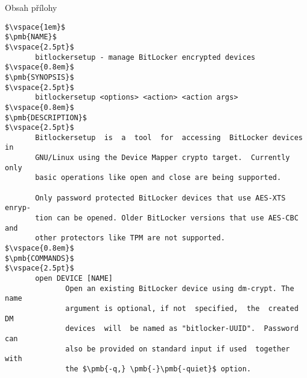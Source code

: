 
\listofappendices

\label{attachment:metadata}
Obsah přílohy

\label{attachment:manpage}


\begin{lstlisting}[frame=none, escapechar=$, columns=fullflexible, keepspaces=true, basicstyle=\ttfamily\small]
$\vspace{1em}$
$\pmb{NAME}$
$\vspace{2.5pt}$
       bitlockersetup - manage BitLocker encrypted devices
$\vspace{0.8em}$
$\pmb{SYNOPSIS}$
$\vspace{2.5pt}$
       bitlockersetup <options> <action> <action args>
$\vspace{0.8em}$
$\pmb{DESCRIPTION}$
$\vspace{2.5pt}$
       Bitlockersetup  is  a  tool  for  accessing  BitLocker devices in
       GNU/Linux using the Device Mapper crypto target.  Currently  only
       basic operations like open and close are being supported.

       Only password protected BitLocker devices that use AES-XTS enryp-
       tion can be opened. Older BitLocker versions that use AES-CBC and
       other protectors like TPM are not supported.
$\vspace{0.8em}$
$\pmb{COMMANDS}$
$\vspace{2.5pt}$
       open DEVICE [NAME]
              Open an existing BitLocker device using dm-crypt. The name
              argument is optional, if not  specified,  the  created  DM
              devices  will  be named as "bitlocker-UUID".  Password can
              also be provided on standard input if used  together  with
              the $\pmb{-q,} \pmb{-}\pmb{-quiet}$ option.


\end{lstlisting}
